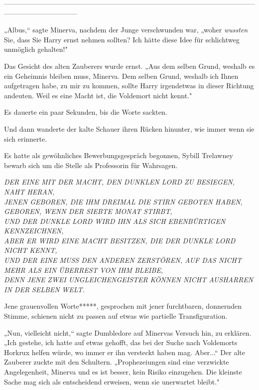 {--------------------------------------------------------------------------------------------------------------------------------------------

\hfill\break „Albus,“ sagte Minerva, nachdem der Junge verschwunden war, „woher \emph{wussten} Sie, dass Sie Harry ernst nehmen sollten? Ich hätte diese Idee für schlichtweg unmöglich gehalten!"

Das Gesicht des alten Zauberers wurde ernst. „Aus dem selben Grund, weshalb es ein Geheimnis bleiben muss, Minerva. Dem selben Grund, weshalb ich Ihnen aufgetragen habe, zu mir zu kommen, sollte Harry irgendetwas in dieser Richtung andeuten. Weil es eine Macht ist, die Voldemort nicht kennt."

Es dauerte ein paar Sekunden, bis die Worte sackten.

Und dann wanderte der kalte Schauer ihren Rücken hinunter, wie immer wenn sie sich erinnerte.

Es hatte als gewöhnliches Bewerbungsgespräch begonnen, Sybill Trelawney bewarb sich um die Stelle als Professorin für Wahrsagen.

\emph{DER EINE MIT DER MACHT, DEN DUNKLEN LORD ZU BESIEGEN, NAHT HERAN,\\ JENEN GEBOREN, DIE IHM DREIMAL DIE STIRN GEBOTEN HABEN,\\ GEBOREN, WENN DER SIEBTE MONAT STIRBT,\\ UND DER DUNKLE LORD WIRD IHN ALS SICH EBENBÜRTIGEN KENNZEICHNEN,\\ ABER ER WIRD EINE MACHT BESITZEN, DIE DER DUNKLE LORD NICHT KENNT,\\ UND DER EINE MUSS DEN ANDEREN ZERSTÖREN, AUF DAS NICHT MEHR ALS EIN ÜBERREST VON IHM BLEIBE,\\ DENN JENE} \emph{ZWEI UNGLEICHENGEISTER} \emph{KÖNNEN NICHT AUSHARREN IN DER} \emph{SELBEN} \emph{WELT.}

Jene grauenvollen Worte*****, gesprochen mit jener furchtbaren, donnernden Stimme, schienen nicht zu passen auf etwas wie partielle Transfiguration.

„Nun, vielleicht nicht,“ sagte Dumbledore auf Minervas Versuch hin, zu erklären. „Ich gestehe, ich hatte auf etwas gehofft, das bei der Suche nach Voldemorts Horkrux helfen würde, wo immer er ihn versteckt haben mag. Aber...“ Der alte Zauberer zuckte mit den Schultern. „Prophezeiungen sind eine verzwickte Angelegenheit, Minerva und es ist besser, kein Risiko einzugehen. Die kleinste Sache mag sich als entscheidend erweisen, wenn sie unerwartet bleibt."

}
